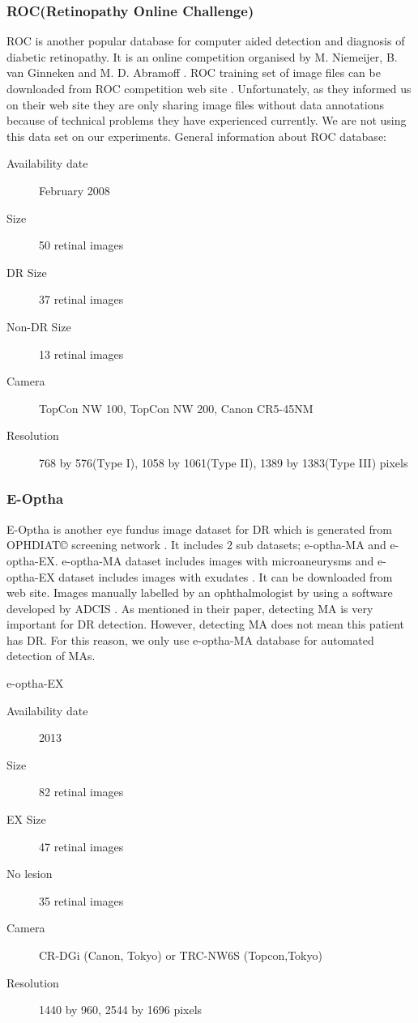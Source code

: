 \subsubsection{ROC(Retinopathy Online Challenge)}

ROC is another popular database for computer aided detection and diagnosis of diabetic retinopathy. It is an online competition organised by M. Niemeijer, B. van Ginneken and M. D. Abramoff \citep{niemeijer2010retinopathy}. ROC training set of image files can be downloaded from ROC competition web site \citep{ROC}. Unfortunately, as they informed us on their web site \citet{ROC} they are only sharing image files without data annotations because of technical problems they have experienced currently. We are not using this data set on our experiments.
General information about ROC database:
\begin{description}
    \item[Availability date] February 2008
    \item[Size] 50 retinal images
    \item[DR Size] 37 retinal images
    \item[Non-DR Size] 13 retinal images
    \item[Camera] TopCon NW 100, TopCon NW 200, Canon CR5-45NM
    \item[Resolution] 768 by 576(Type I), 1058 by 1061(Type II), 1389 by 1383(Type III) pixels
\end{description}

\subsubsection{E-Optha}

E-Optha is another eye fundus image dataset for DR which is generated from OPHDIAT© screening network \citep{massin2008ophdiat}. It includes 2 sub datasets; e-optha-MA and e-optha-EX. e-optha-MA dataset includes images with microaneurysms and e-optha-EX dataset includes images with exudates . It can be downloaded from  \citet{E-Optha} web site. Images manually labelled by an ophthalmologist by using a software developed by ADCIS \citep{decenciere2013teleophta}. As \citet{niemeijer2010retinopathy} mentioned in their paper, detecting MA is very important for DR detection. However, detecting MA does not mean this patient has DR. For this reason, we only use e-optha-MA database for automated detection of MAs. 

e-optha-EX
\begin{description}
    \item[Availability date] 2013
    \item[Size] 82 retinal images
    \item[EX Size] 47 retinal images
    \item[No lesion] 35 retinal images
    \item[Camera] CR-DGi (Canon, Tokyo) or TRC-NW6S (Topcon,Tokyo) \citep{quellec2012multiple}
    \item[Resolution] 1440 by 960, 2544 by 1696 pixels
\end{description}

